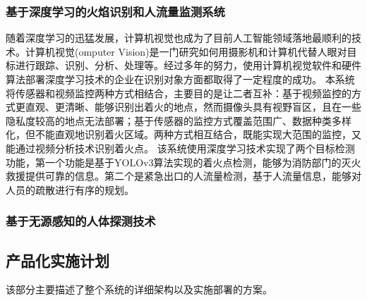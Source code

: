 \documentclass{ctexart}
\begin{document}
	\subsubsection{基于深度学习的火焰识别和人流量监测系统}
	随着深度学习的迅猛发展，计算机视觉也成为了目前人工智能领域落地最顺利的技术。计算机视觉(omputer  Vision)是一门研究如何用摄影机和计算机代替人眼对目标进行跟踪、识别、分析、处理等。经过多年的努力，使用计算机视觉软件和硬件算法部署深度学习技术的企业在识别对象方面都取得了一定程度的成功。
	本系统将传感器和视频监控两种方式相结合，主要目的是让二者互补：基于视频监控的方式更直观、更清晰、能够识别出着火的地点，然而摄像头具有视野盲区，且在一些隐私度较高的地点无法部署；基于传感器的监控方式覆盖范围广、数据种类多样化，但不能直观地识别着火区域。两种方式相互结合，既能实现大范围的监控，又能通过视频分析技术识别着火点。
	该系统使用深度学习技术实现了两个目标检测功能，第一个功能是基于YOLOv3算法实现的着火点检测，能够为消防部门的灭火救援提供可靠的信息。第二个是紧急出口的人流量检测，基于人流量信息，能够对人员的疏散进行有序的规划。
	\subsubsection{基于无源感知的人体探测技术}
	\subsection{产品化实施计划}
	该部分主要描述了整个系统的详细架构以及实施部署的方案。
\end{document}
